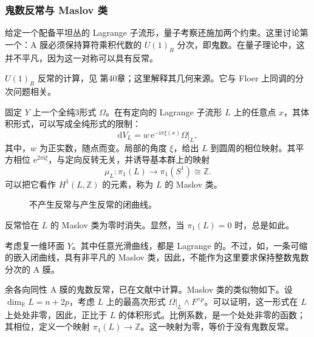 \subsubsection{鬼数反常与 Maslov 类}\label{sec:3.6.1.2}

给定一个配备平坦丛的 Lagrange 子流形，量子考察还施加两个约束。这里讨论第一个：A 膜必须保持算符乘积代数的 $U(1)_R$ 分次，即鬼数。在量子理论中，这并不平凡，因为这一对称可以具有反常。

$U(1)_R$ 反常的计算，见  第40章；这里解释其几何来源。它与 Floer 上同调的分次问题相关。

固定 $Y$ 上一个全纯3形式 $\Omega$。在有定向的 Lagrange 子流形 $L$ 上的任意点 $x$，其体积形式，可以写成全纯形式的限制：
\begin{equation}\label{eq:3.169}
\mathrm{d}V_L=w\,\mathrm{e}^{-\mathrm{i}\pi\xi(x)}\Omega|_L,
\end{equation}
其中，$w$ 为正实数，随点而变。局部的角度 $\xi$，给出 $L$ 到圆周的相位映射。其平方相位 $\mathrm{e}^{2\pi\mathrm{i}\xi}$，与定向反转无关，并诱导基本群上的映射
\begin{equation}\label{eq:3.170}
\mu_L\colon\pi_1(L)\longrightarrow\pi_1(S^1)\cong\mathbb{Z}.
\end{equation}
可以把它看作 $H^1(L,\mathbb{Z})$ 的元素，称为 $L$ 的 Maslov 类。
\begin{figure}[H]
\centering
{}
\caption{不产生反常与产生反常的闭曲线。}\label{fig:3.7}
\end{figure}

反常恰在 $L$ 的 Maslov 类为零时消失。显然，当 $\pi_1(L)=0$ 时，总是如此。
\begin{example*}
考虑复一维环面 $Y$。其中任意光滑曲线，都是 Lagrange 的。不过，如，一条可缩的嵌入闭曲线，具有非平凡的 Maslov 类，因此，不能作为这里要求保持整数鬼数分次的 A 膜。
\end{example*}

余各向同性 A 膜的鬼数反常，已在文献中计算。Maslov 类的类似物如下。设 $\dim_{\mathbb{R}}L=n+2p$，考虑 $L$ 上的最高次形式 $\Omega|_L\wedge F^{\wedge p}$。可以证明，这一形式在 $L$ 上处处非零，因此，正比于 $L$ 的体积形式。比例系数，是一个处处非零的函数；其相位，定义一个映射 $\pi_1(L)\to\mathbb{Z}$。这一映射为零，等价于没有鬼数反常。

